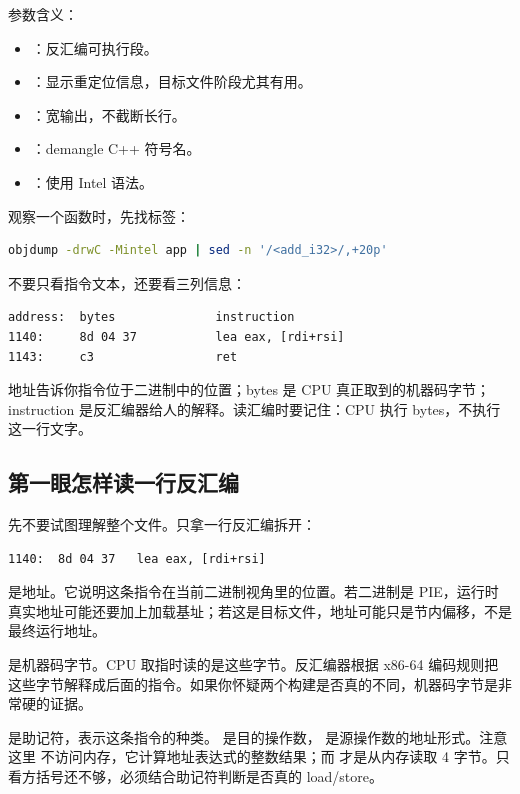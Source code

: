 参数含义：

\begin{itemize}
  \item {}：反汇编可执行段。
  \item {}：显示重定位信息，目标文件阶段尤其有用。
  \item {}：宽输出，不截断长行。
  \item {}：demangle C++ 符号名。
  \item {}：使用 Intel 语法。
\end{itemize}

观察一个函数时，先找标签：

\begin{lstlisting}[language=bash]
objdump -drwC -Mintel app | sed -n '/<add_i32>/,+20p'
\end{lstlisting}

不要只看指令文本，还要看三列信息：

\begin{lstlisting}
address:  bytes              instruction
1140:     8d 04 37           lea eax, [rdi+rsi]
1143:     c3                 ret
\end{lstlisting}

地址告诉你指令位于二进制中的位置；bytes 是 CPU 真正取到的机器码字节；instruction 是反汇编器给人的解释。读汇编时要记住：CPU 执行 bytes，不执行这一行文字。

\subsection{第一眼怎样读一行反汇编}

先不要试图理解整个文件。只拿一行反汇编拆开：

\begin{lstlisting}[numbers=none,caption={一行反汇编的四个部分}]
1140:  8d 04 37   lea eax, [rdi+rsi]
\end{lstlisting}

 是地址。它说明这条指令在当前二进制视角里的位置。若二进制是 PIE，运行时真实地址可能还要加上加载基址；若这是目标文件，地址可能只是节内偏移，不是最终运行地址。

 是机器码字节。CPU 取指时读的是这些字节。反汇编器根据 x86-64 编码规则把这些字节解释成后面的指令。如果你怀疑两个构建是否真的不同，机器码字节是非常硬的证据。

 是助记符，表示这条指令的种类。 是目的操作数， 是源操作数的地址形式。注意这里  不访问内存，它计算地址表达式的整数结果；而  才是从内存读取 4 字节。只看方括号还不够，必须结合助记符判断是否真的 load/store。


